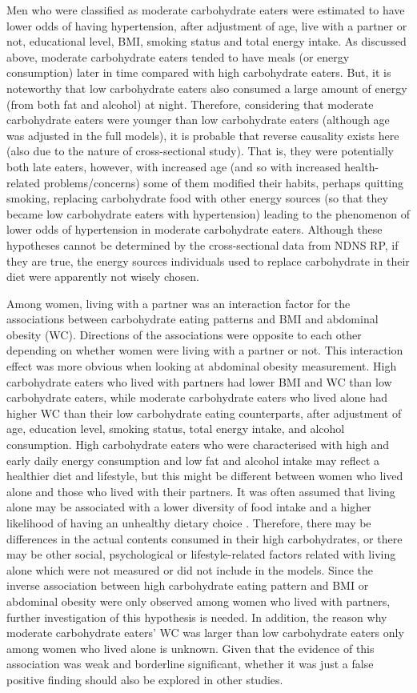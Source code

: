 Men who were classified as moderate carbohydrate eaters were estimated to have lower odds of having hypertension, after adjustment of age, live with a partner or not, educational level, BMI, smoking status and total energy intake. As discussed above, moderate carbohydrate eaters tended to have meals (or energy consumption) later in time compared with high carbohydrate eaters. But, it is noteworthy that low carbohydrate eaters also consumed a large amount of energy (from both fat and alcohol) at night. Therefore, considering that moderate carbohydrate eaters were younger than low carbohydrate eaters (although age was adjusted in the full models), it is probable that reverse causality exists here (also due to the nature of cross-sectional study). That is, they were potentially both late eaters, however, with increased age (and so with increased health-related problems/concerns) some of them modified their habits, perhaps quitting smoking, replacing carbohydrate food with other energy sources (so that they became low carbohydrate eaters with hypertension) leading to the phenomenon of lower odds of hypertension in moderate carbohydrate eaters. Although these hypotheses cannot be determined by the cross-sectional data from NDNS RP, if they are true, the energy sources individuals used to replace carbohydrate in their diet were apparently not wisely chosen. 

Among women, living with a partner was an interaction factor for the associations between carbohydrate eating patterns and BMI and abdominal obesity (WC). Directions of the associations were opposite to each other depending on whether women were living with a partner or not. This interaction effect was more obvious when looking at abdominal obesity measurement. High carbohydrate eaters who lived with partners had lower BMI and WC than low carbohydrate eaters, while moderate carbohydrate eaters who lived alone had higher WC than their low carbohydrate eating counterparts, after adjustment of age, education level, smoking status, total energy intake, and alcohol consumption. High carbohydrate eaters who were characterised with high and early daily energy consumption and low fat and alcohol intake may reflect a healthier diet and lifestyle, but this might be different between women who lived alone and those who lived with their partners. It was often assumed that living alone may be associated with a lower diversity of food intake and a higher likelihood of having an unhealthy dietary choice \parencite{hanna2015relationship}. Therefore, there may be differences in the actual contents consumed in their high carbohydrates, or there may be other social, psychological or lifestyle-related factors related with living alone which were not measured or did not include in the models. Since the inverse association between high carbohydrate eating pattern and BMI or abdominal obesity were only observed among women who lived with partners, further investigation of this hypothesis is needed. In addition, the reason why moderate carbohydrate eaters' WC was larger than low carbohydrate eaters only among women who lived alone is unknown. Given that the evidence of this association was weak and borderline significant, whether it was just a false positive finding should also be explored in other studies.

